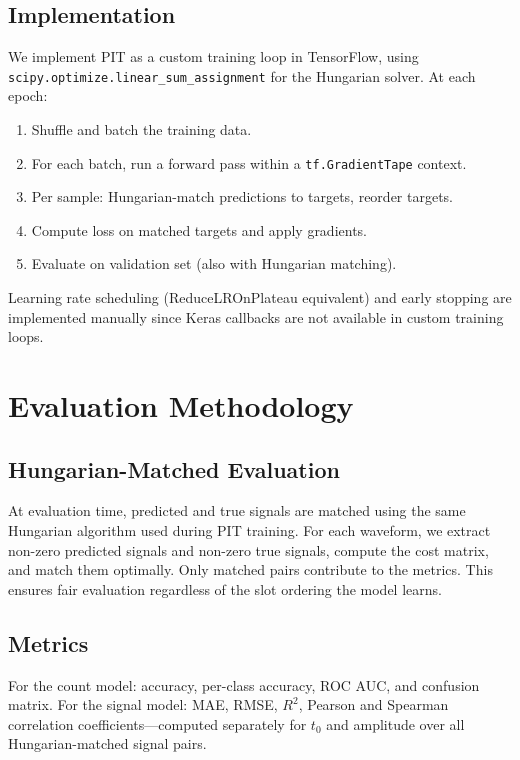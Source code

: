 \documentclass[11pt,twocolumn]{article}
\begin{document}
\subsection{Implementation}

We implement PIT as a custom training loop in TensorFlow, using \texttt{scipy.optimize.linear\_sum\_assignment} for the Hungarian solver.
At each epoch:
\begin{enumerate}
    \item Shuffle and batch the training data.
    \item For each batch, run a forward pass within a \texttt{tf.GradientTape} context.
    \item Per sample: Hungarian-match predictions to targets, reorder targets.
    \item Compute loss on matched targets and apply gradients.
    \item Evaluate on validation set (also with Hungarian matching).
\end{enumerate}

Learning rate scheduling (ReduceLROnPlateau equivalent) and early stopping are implemented manually since Keras callbacks are not available in custom training loops.

\section{Evaluation Methodology}
\label{sec:eval}

\subsection{Hungarian-Matched Evaluation}

At evaluation time, predicted and true signals are matched using the same Hungarian algorithm used during PIT training.
For each waveform, we extract non-zero predicted signals and non-zero true signals, compute the cost matrix, and match them optimally.
Only matched pairs contribute to the metrics.
This ensures fair evaluation regardless of the slot ordering the model learns.

\subsection{Metrics}

For the count model: accuracy, per-class accuracy, ROC AUC, and confusion matrix.
For the signal model: MAE, RMSE, $R^2$, Pearson and Spearman correlation coefficients---computed separately for $t_0$ and amplitude over all Hungarian-matched signal pairs.
\end{document}
